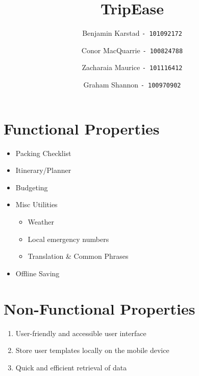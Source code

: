 \documentclass[12pt]{article}
\title{TripEase}
\author{
Benjamin Karstad
\texttt{- 101092172}
\and
Conor MacQuarrie
\texttt{- 100824788}
\and
Zacharaia Maurice
\texttt{- 101116412}
\and
Graham Shannon
\texttt{- 100970902}
}
\begin{document}
	\maketitle

	\section*{Functional Properties}

	\begin{itemize}

		\item{Packing Checklist}

		\item{Itinerary/Planner}

		\item{Budgeting}

		\item{Misc Utilities}

		\begin{itemize}
			\item Weather
			\item Local emergency numbers
			\item Translation \& Common Phrases
		\end{itemize}

		\item{Offline Saving}

	\end{itemize}

	\section*{Non-Functional Properties}


	\begin{enumerate}
		\item{User-friendly and accessible user interface}

		\item{Store user templates locally on the mobile device}

		\item{Quick and efficient retrieval of data}
	\end{enumerate}

	\pagebreak
\end{document}

